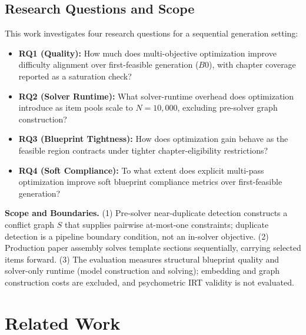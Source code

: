 \documentclass[runningheads]{llncs}
\begin{document}
\subsection{Research Questions and Scope}
This work investigates four research questions for a sequential generation setting:
\begin{itemize}\setlength{\itemsep}{1pt}\setlength{\parskip}{0pt}
    \item \textbf{RQ1 (Quality):} How much does multi-objective optimization improve difficulty alignment over first-feasible generation ($B0$), with chapter coverage reported as a saturation check?
    \item \textbf{RQ2 (Solver Runtime):} What solver-runtime overhead does optimization introduce as item pools scale to $N=10{,}000$, excluding pre-solver graph construction?
    \item \textbf{RQ3 (Blueprint Tightness):} How does optimization gain behave as the feasible region contracts under tighter chapter-eligibility restrictions?
    \item \textbf{RQ4 (Soft Compliance):} To what extent does explicit multi-pass optimization improve soft blueprint compliance metrics over first-feasible generation?
\end{itemize}

\noindent\textbf{Scope and Boundaries.} (1) Pre-solver near-duplicate detection constructs a conflict graph $S$ that supplies pairwise at-most-one constraints; duplicate detection is a pipeline boundary condition, not an in-solver objective. (2) Production paper assembly solves template sections sequentially, carrying selected items forward. (3) The evaluation measures structural blueprint quality and solver-only runtime (model construction and solving); embedding and graph construction costs are excluded, and psychometric IRT validity is not evaluated.

\section{Related Work}
\label{sec:related}
\end{document}
